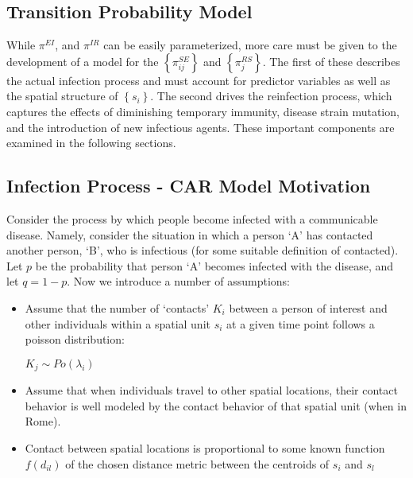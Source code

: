 \documentclass[12pt]{article}
\begin{document}
\subsection{Transition Probability Model}

        While $\pi^{EI}$, and $\pi^{IR}$ can be easily parameterized, more care must be given to the development 
        of a model for the $\left\{\pi^{SE}_{ij} \right\}$ and $\left\{\pi^{RS}_j \right\}$. The first of these 
        describes the actual infection process and must account for predictor variables as well as the 
        spatial structure of $\left\{ s_i \right\}$. The second drives the reinfection process, which captures the
        effects of diminishing temporary immunity, disease strain mutation, and the introduction of new infectious 
        agents. These important components are examined in the following sections. 

\subsection{Infection Process - CAR Model Motivation}

Consider the process by which people become infected with a communicable disease. 
Namely, consider the situation in which a person `A' has contacted another person, `B', 
who is infectious (for some suitable definition of contacted). 
Let $p$ be the probability that person `A' becomes infected with the disease, and
let $q=1-p$. Now we introduce a number of assumptions:

\begin{itemize}

    \item Assume that the number of `contacts' $K_i$ between a person of interest 
    and other individuals within a spatial unit $s_i$ at a given time point follows a poisson 
    distribution:\\
    \begin{center}
        $K_j \sim Po(\lambda_i)$
    \end{center}
    \item Assume that when individuals travel to other spatial locations, their 
        contact behavior is well modeled by the contact behavior of that spatial unit (when in Rome).  
    \item Contact between spatial locations is proportional to some known function $f(d_{il})$
        of the chosen distance metric between the centroids of $s_i$ and $s_l$
\end{itemize}
\end{document}
